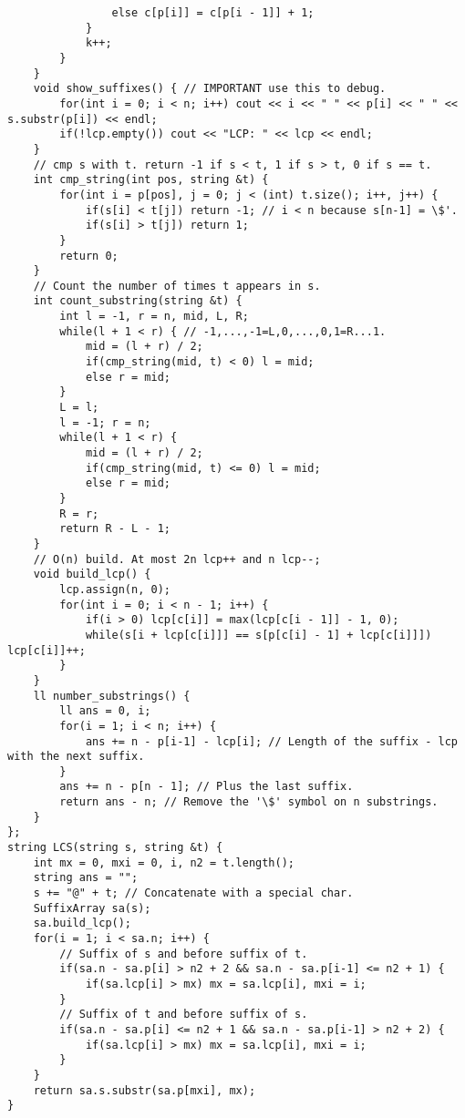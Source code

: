 \documentclass[a4paper]{article}
\begin{document}
\begin{verbatim}
                else c[p[i]] = c[p[i - 1]] + 1;
            }
            k++;
        }
    }
    void show_suffixes() { // IMPORTANT use this to debug.
        for(int i = 0; i < n; i++) cout << i << " " << p[i] << " " << s.substr(p[i]) << endl;
        if(!lcp.empty()) cout << "LCP: " << lcp << endl;
    }
    // cmp s with t. return -1 if s < t, 1 if s > t, 0 if s == t.
    int cmp_string(int pos, string &t) {
        for(int i = p[pos], j = 0; j < (int) t.size(); i++, j++) {
            if(s[i] < t[j]) return -1; // i < n because s[n-1] = \$'.
            if(s[i] > t[j]) return 1;
        }
        return 0;
    }
    // Count the number of times t appears in s.
    int count_substring(string &t) {
        int l = -1, r = n, mid, L, R;
        while(l + 1 < r) { // -1,...,-1=L,0,...,0,1=R...1.
            mid = (l + r) / 2;
            if(cmp_string(mid, t) < 0) l = mid;
            else r = mid;
        }
        L = l;
        l = -1; r = n;
        while(l + 1 < r) {
            mid = (l + r) / 2;
            if(cmp_string(mid, t) <= 0) l = mid;
            else r = mid;
        }
        R = r;
        return R - L - 1;
    }
    // O(n) build. At most 2n lcp++ and n lcp--;
    void build_lcp() {
        lcp.assign(n, 0);
        for(int i = 0; i < n - 1; i++) {
            if(i > 0) lcp[c[i]] = max(lcp[c[i - 1]] - 1, 0);
            while(s[i + lcp[c[i]]] == s[p[c[i] - 1] + lcp[c[i]]]) lcp[c[i]]++;
        }
    }
    ll number_substrings() {
        ll ans = 0, i;
        for(i = 1; i < n; i++) {
            ans += n - p[i-1] - lcp[i]; // Length of the suffix - lcp with the next suffix.
        }
        ans += n - p[n - 1]; // Plus the last suffix.
        return ans - n; // Remove the '\$' symbol on n substrings.
    }
};
string LCS(string s, string &t) {
    int mx = 0, mxi = 0, i, n2 = t.length();
    string ans = "";
    s += "@" + t; // Concatenate with a special char.
    SuffixArray sa(s);
    sa.build_lcp();
    for(i = 1; i < sa.n; i++) {
        // Suffix of s and before suffix of t.
        if(sa.n - sa.p[i] > n2 + 2 && sa.n - sa.p[i-1] <= n2 + 1) {
            if(sa.lcp[i] > mx) mx = sa.lcp[i], mxi = i;
        }
        // Suffix of t and before suffix of s.
        if(sa.n - sa.p[i] <= n2 + 1 && sa.n - sa.p[i-1] > n2 + 2) {
            if(sa.lcp[i] > mx) mx = sa.lcp[i], mxi = i;
        }
    }
    return sa.s.substr(sa.p[mxi], mx);
}
\end{verbatim}
\end{document}
